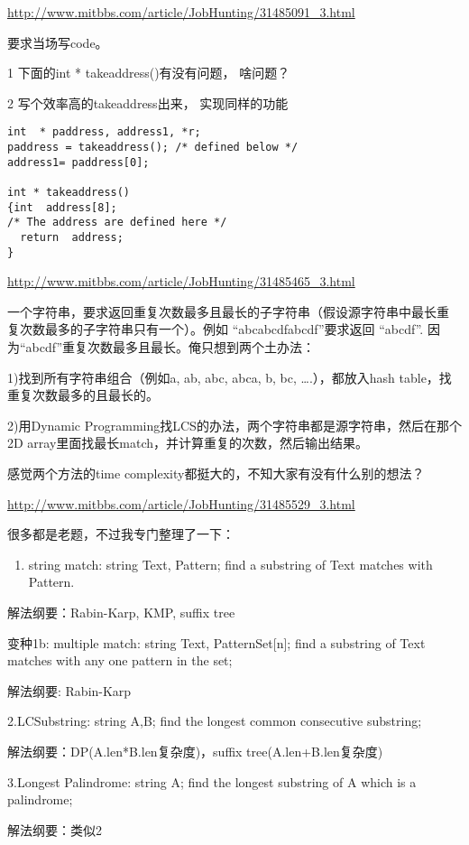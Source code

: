 \documentclass[12pt]{book}
\begin{document}
\url{http://www.mitbbs.com/article/JobHunting/31485091_3.html}

要求当场写code。 

1  下面的int * takeaddress()有没有问题， 啥问题？ 

2  写个效率高的takeaddress出来， 实现同样的功能
\lstset{language=java,label= ,caption= ,numbers=none}
\begin{lstlisting}
int  * paddress, address1, *r;
paddress = takeaddress(); /* defined below */
address1= paddress[0];

int * takeaddress()
{int  address[8];
/* The address are defined here */
  return  address;
}
\end{lstlisting}
\url{http://www.mitbbs.com/article/JobHunting/31485465_3.html}

一个字符串，要求返回重复次数最多且最长的子字符串（假设源字符串中最长重
复次数最多的子字符串只有一个）。例如 “abcabcdfabcdf”要求返回
“abcdf”. 因为“abcdf”重复次数最多且最长。俺只想到两个土办法：

1)找到所有字符串组合（例如a, ab, abc, abca, b, bc, \ldots{}.），都放入hash table，找重复次数最多的且最长的。

2)用Dynamic Programming找LCS的办法，两个字符串都是源字符串，然后在那个2D array里面找最长match，并计算重复的次数，然后输出结果。

感觉两个方法的time complexity都挺大的，不知大家有没有什么别的想法？

\url{http://www.mitbbs.com/article/JobHunting/31485529_3.html}

很多都是老题，不过我专门整理了一下：

\begin{enumerate}
\item string match: string Text, Pattern; find a substring of Text matches with Pattern.
\end{enumerate}

解法纲要：Rabin-Karp, KMP, suffix tree

变种1b: multiple match: string Text, PatternSet[n]; find a substring of Text matches with any one pattern in the set;

解法纲要: Rabin-Karp

2.LCSubstring: string A,B; find the longest common consecutive substring;

解法纲要：DP(A.len*B.len复杂度)，suffix tree(A.len+B.len复杂度) 

3.Longest Palindrome: string A; find the longest substring of A which is a palindrome;

解法纲要：类似2
\end{document}
